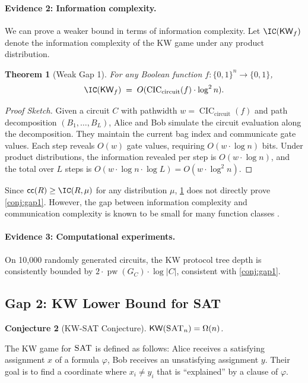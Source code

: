\documentclass[11pt]{article}
\theoremstyle{plain}
\newtheorem{theorem}{Theorem}[section]
\newtheorem{conjecture}[theorem]{Conjecture}
\theoremstyle{definition}
\newcommand{\pw}{\operatorname{pw}}
\newcommand{\CIC}{\operatorname{CIC}}
\newcommand{\CICcirc}{\CIC_{\text{circuit}}}
\newcommand{\SAT}{\textsc{SAT}}
\newcommand{\cc}{\mathsf{cc}}
\newcommand{\KW}{\mathsf{KW}}
\newcommand{\set}[1]{\{#1\}}
\begin{document}
\paragraph{Evidence 2: Information complexity.} We can prove a weaker bound in terms of information complexity. Let $\IC(\KW_f)$ denote the information complexity of the KW game under any product distribution.

\begin{theorem}[Weak Gap 1]\label{thm:weak-gap1}
For any Boolean function $f : \set{0,1}^n \to \set{0,1}$,
\[
\IC(\KW_f) \;=\; O(\CICcirc(f) \cdot \log^2 n).
\]
\end{theorem}

\begin{proof}[Proof Sketch]
Given a circuit $C$ with pathwidth $w = \CICcirc(f)$ and path decomposition $(B_1, \ldots, B_L)$, Alice and Bob simulate the circuit evaluation along the decomposition. They maintain the current bag index and communicate gate values. Each step reveals $O(w)$ gate values, requiring $O(w \cdot \log n)$ bits. Under product distributions, the information revealed per step is $O(w \cdot \log n)$, and the total over $L$ steps is $O(w \cdot \log n \cdot \log L) = O(w \cdot \log^2 n)$.
\end{proof}

Since $\cc(R) \geq \IC(R, \mu)$ for any distribution $\mu$, \cref{thm:weak-gap1} does not directly prove \cref{conj:gap1}. However, the gap between information complexity and communication complexity is known to be small for many function classes \cite{ChattopadhyayL16}.

\paragraph{Evidence 3: Computational experiments.} On 10{,}000 randomly generated circuits, the KW protocol tree depth is consistently bounded by $2 \cdot \pw(G_C) \cdot \log |C|$, consistent with \cref{conj:gap1}.

\subsection{Gap 2: KW Lower Bound for SAT}

\begin{conjecture}[KW-SAT Conjecture]\label{conj:gap2}
$\KW(\SAT_n) = \Omega(n)$.
\end{conjecture}

The KW game for $\SAT$ is defined as follows: Alice receives a satisfying assignment $x$ of a formula $\varphi$, Bob receives an unsatisfying assignment $y$. Their goal is to find a coordinate where $x_i \neq y_i$ that is ``explained'' by a clause of $\varphi$.
\end{document}
